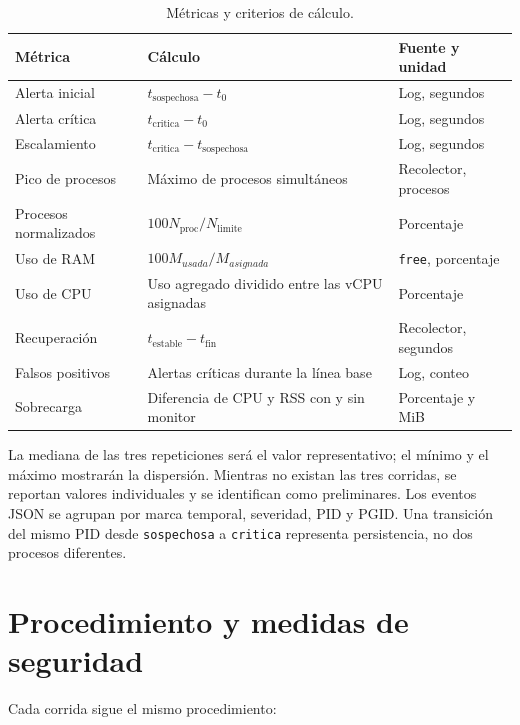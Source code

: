 \begin{table}[H]
  \centering
  \caption{Métricas y criterios de cálculo.}
  \label{tab:metricas-evaluacion}
  \small
  \begin{tabular}{p{}p{}p{}}
    \toprule
    Métrica & Cálculo & Fuente y unidad \\
    \midrule
    Alerta inicial & $t_{\mathrm{sospechosa}}-t_0$ & Log, segundos \\
    Alerta crítica & $t_{\mathrm{critica}}-t_0$ & Log, segundos \\
    Escalamiento & $t_{\mathrm{critica}}-t_{\mathrm{sospechosa}}$ & Log, segundos \\
    Pico de procesos & Máximo de procesos simultáneos & Recolector, procesos \\
    Procesos normalizados & $100N_{\mathrm{proc}}/N_{\mathrm{limite}}$ & Porcentaje \\
    Uso de RAM & $100M_{usada}/M_{asignada}$ & \texttt{free}, porcentaje \\
    Uso de CPU & Uso agregado dividido entre las vCPU asignadas & Porcentaje \\
    Recuperación & $t_{\mathrm{estable}}-t_{\mathrm{fin}}$ & Recolector, segundos \\
    Falsos positivos & Alertas críticas durante la línea base & Log, conteo \\
    Sobrecarga & Diferencia de CPU y RSS con y sin monitor & Porcentaje y MiB \\
    \bottomrule
  \end{tabular}
\end{table}

La mediana de las tres repeticiones será el valor representativo; el mínimo y
el máximo mostrarán la dispersión. Mientras no existan las tres corridas, se
reportan valores individuales y se identifican como preliminares. Los eventos
JSON se agrupan por marca temporal, severidad, PID y PGID. Una transición del
mismo PID desde \texttt{sospechosa} a \texttt{critica} representa persistencia,
no dos procesos diferentes.

\section{Procedimiento y medidas de seguridad}
\label{sec:procedimiento-seguridad}

Cada corrida sigue el mismo procedimiento:

